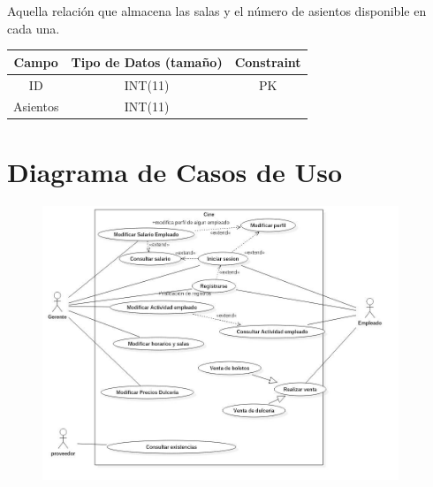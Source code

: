 \documentclass[12pt, fleqn]{report}                             %
\begin{document}
            Aquella relación que almacena las salas y el número de asientos disponible
            en cada una.

            \vspace{2em}

            \small{
            \begin{tabular}{| c | c | c |}
                \hline
                \textbf{Campo} & \textbf{Tipo de Datos (tamaño)} & \textbf{Constraint} \\[0.5ex] 
                \hline\hline
                
                ID          & INT(11)       & PK                    \\
                Asientos    & INT(11)       &                       \\
                \hline
            \end{tabular}
            }










    \clearpage
    \section{Diagrama de Casos de Uso}

        \begin{figure}[h]
            \centering
            \includegraphics[width=0.95\textwidth]{DiagramasDeCasosDeUso}
        \end{figure}
\end{document}
